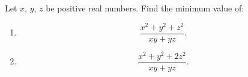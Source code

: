 Let $ x$, $ y$, $ z$ be positive real numbers. Find the minimum value of:

\begin{enumerate}[label = (\alph*)]
	\item \[ \frac{x^2 + y^2 + z^2}{xy + yz}. \]
	\item \[ \frac{x^2 + y^2 + 2z^2}{xy + yz}. \]
\end{enumerate}

